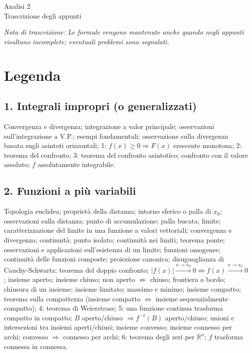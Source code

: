 \documentclass[11pt,a4paper]{article}
\newcommand{\R}{\mathbb R}\newcommand{\N}{\mathbb N}\newcommand{\pagina}[1]{\clearpage}
\newcommand{\nota}[1]{\par\textit{Nota di trascrizione: #1}\par}
\begin{document}
\begin{center}{\LARGE Analisi 2}\\Trascrizione degli appunti\end{center}
\nota{Le formule vengono mantenute anche quando negli appunti risultano incomplete; eventuali problemi sono segnalati.}
\pagina{1}\section*{Legenda}
\subsection*{1. Integrali impropri (o generalizzati)}
Convergenza e divergenza; integrazione a valor principale; osservazioni sull'integrazione a V.P.; esempi fondamentali; osservazione sulla divergenza basata sugli asintoti orizzontali; 1: $f(x)\ge0\Rightarrow F(x)$ crescente monotona; 2: teorema del confronto; 3: teorema del confronto asintotico; confronto con il valore assoluto; $f$ assolutamente integrabile.
\subsection*{2. Funzioni a più variabili}
Topologia euclidea; proprietà della distanza; intorno sferico o palla di $x_0$; osservazioni sulla distanza; punto di accumulazione; palla bucata; limite; caratterizzazione del limite in una funzione a valori vettoriali; convergenza e divergenza; continuità; punto isolato; continuità nei limiti; teorema ponte; osservazioni e applicazioni sull'esistenza di un limite; funzioni omogenee; continuità delle funzioni composte; proiezione canonica; disuguaglianza di Cauchy-Schwartz; teorema del doppio confronto; $|f(x)|\xrightarrow{x\to x_0}0\iff f(x)\xrightarrow{x\to x_0}0$; insieme aperto; insieme chiuso; non aperto $\not\Rightarrow$ chiuso; frontiera o bordo; chiusura di un insieme; insieme limitato; massimo e minimo; insieme compatto; teorema sulla compattezza (insieme compatto $\iff$ insieme sequenzialmente compatto); 4: teorema di Weierstrass; 5: una funzione continua trasforma compatto in compatto; $B$ aperto/chiuso $\Rightarrow f^{-1}(B)$ aperto/chiuso; unioni e intersezioni tra insiemi aperti/chiusi; insieme convesso; insieme connesso per archi; convesso $\Rightarrow$ connesso per archi; 6: teorema degli zeri per $\R^n$; $f$ trasforma connessa in connessa.
\end{document}
